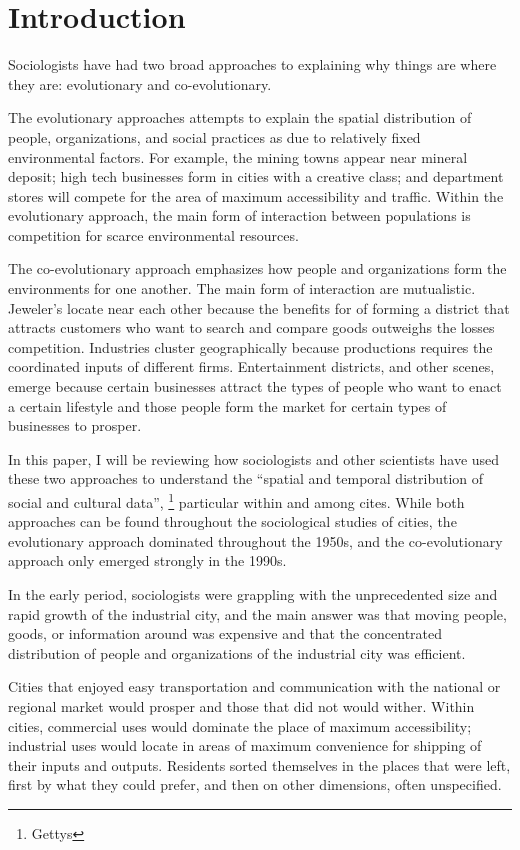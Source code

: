 \documentclass[12pt,draft,letter]{article}
\begin{document}
\section{Introduction}
Sociologists have had two broad approaches to explaining why things
are where they are: evolutionary and co-evolutionary.

The evolutionary approaches attempts to explain the spatial
distribution of people, organizations, and social practices as due to
relatively fixed environmental factors. For example, the mining towns
appear near mineral deposit; high tech businesses form in cities with
a creative class; and department stores will compete for the area of
maximum accessibility and traffic. Within the evolutionary approach,
the main form of interaction between populations is competition for
scarce environmental resources.

The co-evolutionary approach emphasizes how people and organizations
form the environments for one another. The main form of interaction
are mutualistic. Jeweler's locate near each other because the benefits
for of forming a district that attracts customers who want to search
and compare goods outweighs the losses competition. Industries cluster
geographically because productions requires the coordinated inputs of
different firms. Entertainment districts, and other scenes, emerge
because certain businesses attract the types of people who want to
enact a certain lifestyle and those people form the market for certain
types of businesses to prosper.

In this paper, I will be reviewing how sociologists and other
scientists have used these two approaches to understand the ``spatial
and temporal distribution of social and cultural
data'', \footnote{Gettys} particular within and among cites. While
both approaches can be found throughout the sociological studies of
cities, the evolutionary approach dominated throughout the 1950s, and
the co-evolutionary approach only emerged strongly in the 1990s. 

In the early period, sociologists were grappling with the unprecedented
size and rapid growth of the industrial city, and the main answer was
that moving people, goods, or information around was expensive and
that the concentrated distribution of people and organizations of the
industrial city was efficient.

Cities that enjoyed easy transportation and communication with the
national or regional market would prosper and those that did not would
wither. Within cities, commercial uses would dominate the place of
maximum accessibility; industrial uses would locate in areas of
maximum convenience for shipping of their inputs and
outputs. Residents sorted themselves in the places that were left,
first by what they could prefer, and then on other dimensions, often
unspecified.
\end{document}
